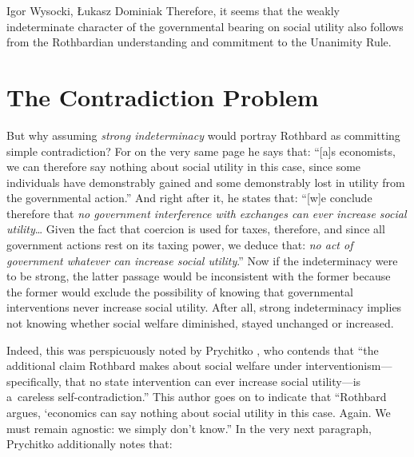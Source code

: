 \begin{artengenv}{Igor Wysocki, Łukasz Dominiak}
\parencite[][p.253]{rothbard_toward_2008} %
 Therefore, it seems that the weakly indeterminate character of the governmental bearing on social utility also follows from the Rothbardian understanding and commitment to the Unanimity Rule.



\section{The Contradiction Problem}

But why assuming \textit{strong indeterminacy} would portray Rothbard as committing simple contradiction? For on the very same page he says that: ``[a]s economists, we can therefore say nothing about social utility in this case, since some individuals have demonstrably gained and some demonstrably lost in utility from the governmental action.'' 
\parencite[][p.252]{rothbard_toward_2008} %
 And right after it, he states that: ``[w]e conclude therefore that \textit{no government interference with exchanges can ever increase social utility}… Given the fact that coercion is used for taxes, therefore, and since all government actions rest on its taxing power, we deduce that: \textit{no act of government whatever can increase social utility}.'' 
\parencite[][p.252]{rothbard_toward_2008} %
 Now if the indeterminacy were to be strong, the latter passage would be inconsistent with the former because the former would exclude the possibility of knowing that governmental interventions never increase social utility. After all, strong indeterminacy implies not knowing whether social welfare diminished, stayed unchanged or increased.



Indeed, this was perspicuously noted by Prychitko 
\parencite*[][p.575]{prychitko_formalism_1993}, %
 who contends that ``the additional claim Rothbard makes about social welfare under interventionism---specifically, that no state intervention can ever increase social utility---is a~careless self-contradiction.'' This author goes on to indicate that ``Rothbard argues, ‘economics can say nothing about social utility in this case. Again. We must remain agnostic: we simply don't know.'' In the very next paragraph, Prychitko 
\parencite*[][p.576]{prychitko_formalism_1993} %
 additionally notes that:




\end{artengenv}
